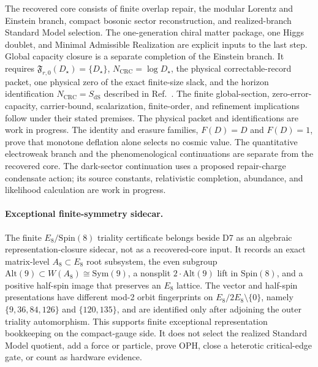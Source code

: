 \documentclass[11pt]{article}
\begin{document}
The recovered core consists of finite overlap repair, the modular Lorentz and
Einstein branch, compact bosonic sector reconstruction, and realized-branch
Standard Model selection. The one-generation chiral matter package, one Higgs
doublet, and Minimal Admissible Realization are explicit inputs to the last
step. Global capacity closure is a separate completion of the Einstein branch.
It requires
\(\mathfrak F_{r,0}(D_\star)=\{D_\star\}\),
\(N_{\mathrm{CRC}}=\log D_\star\), the physical correctable-record packet, one
physical zero of the exact finite-size slack, and the horizon identification
\(N_{\mathrm{CRC}}=S_{\mathrm{dS}}\) described in
Ref.~\cite{ophsynthesis}. The finite global-section, zero-error-capacity,
carrier-bound, scalarization, finite-order, and refinement implications follow
under their stated premises. The physical packet and identifications are work
in progress. The identity and erasure families, \(F(D)=D\) and \(F(D)=1\),
prove that monotone deflation alone selects no cosmic value. The quantitative
electroweak branch and the phenomenological continuations are separate from
the recovered core. The dark-sector continuation uses a proposed repair-charge
condensate action; its source constants, relativistic completion, abundance,
and likelihood calculation are work in progress.

\paragraph{Exceptional finite-symmetry sidecar.}
The finite \(E_8/\mathrm{Spin}(8)\) triality certificate belongs beside D7 as an algebraic
representation-closure sidecar, not as a recovered-core input. It records an exact
matrix-level \(A_8\subset E_8\) root subsystem, the even subgroup
\(\mathrm{Alt}(9)\subset W(A_8)\cong\mathrm{Sym}(9)\), a nonsplit
\(2\!\cdot\!\mathrm{Alt}(9)\) lift in \(\mathrm{Spin}(8)\), and a positive half-spin image that
preserves an \(E_8\) lattice. The vector and half-spin presentations have different mod-2 orbit
fingerprints on \(E_8/2E_8\setminus\{0\}\), namely \(\{9,36,84,126\}\) and \(\{120,135\}\), and
are identified only after adjoining the outer triality automorphism. This supports finite
exceptional representation bookkeeping on the compact-gauge side. It does not select the realized
Standard Model quotient, add a force or particle, prove OPH, close a heterotic critical-edge gate,
or count as hardware evidence.
\end{document}
